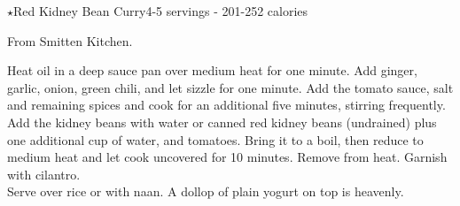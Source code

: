 \begin{recipe}{$\star$Red Kidney Bean Curry}{4-5 servings - 201-252 calories}{}

\freeform From Smitten Kitchen.


Heat oil in a deep sauce pan over medium heat for one minute. Add ginger, garlic, onion, green chili, and let sizzle for one minute. Add the tomato sauce, salt and remaining spices and cook for an additional five minutes, stirring frequently. Add the kidney beans with water or canned red kidney beans (undrained) plus one additional cup of water, and tomatoes. Bring it to a boil, then reduce to medium heat and let cook uncovered for 10 minutes. Remove from heat. Garnish with cilantro.\\

Serve over rice or with naan. A dollop of plain yogurt on top is heavenly.

\end{recipe}